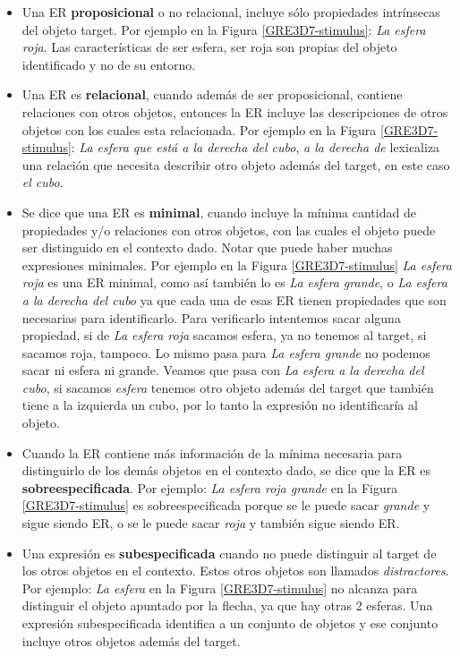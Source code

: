 \begin{itemize}
\item Una ER {\bf proposicional} o no relacional, incluye s\'olo propiedades intr\'insecas del objeto target. Por ejemplo en la Figura \ref{GRE3D7-stimulus}: {\it La esfera roja}. Las caracter\'isticas de ser esfera, ser roja son propias del objeto identificado y no de su entorno.

\item Una ER es {\bf relacional}, cuando adem\'as de ser proposicional, contiene relaciones con otros objetos, entonces la ER incluye las descripciones de otros objetos con los cuales esta relacionada. Por ejemplo en la Figura \ref{GRE3D7-stimulus}: {\it La esfera que est\'a a la derecha del cubo}, {\it a la derecha de} lexicaliza una relaci\'on que necesita describir otro objeto adem\'as del target, en este caso {\it el cubo}.

\item \label{sec:minimales} Se dice que una ER es {\bf minimal}, cuando incluye la m\'inima cantidad de propiedades y/o relaciones con otros objetos, con las cuales el objeto puede ser distinguido en el contexto dado. Notar que puede haber muchas expresiones minimales. Por ejemplo en la Figura \ref{GRE3D7-stimulus} {\it La esfera roja} es una ER minimal, como as\'i tambi\'en lo es {\it La esfera grande}, o {\it La esfera a la derecha del cubo} ya que cada una de esas ER tienen propiedades que son necesarias para identificarlo. Para verificarlo intentemos sacar alguna propiedad, si de {\it La esfera roja} sacamos esfera, ya no tenemos al target, si sacamos roja, tampoco. Lo mismo pasa para {\it La esfera grande} no podemos sacar ni esfera ni grande. Veamos que pasa con {\it La esfera a la derecha del cubo}, si sacamos {\it esfera} tenemos otro objeto adem\'as del target que tambi\'en tiene a la izquierda un cubo, por lo tanto la expresi\'on no identificar\'ia al objeto.

\item Cuando la ER contiene m\'as informaci\'on de la m\'inima necesaria para distinguirlo de los dem\'as objetos en el contexto dado, se dice que la ER es {\bf sobreespecificada}. Por ejemplo: {\it La esfera roja grande} en la Figura \ref{GRE3D7-stimulus} es sobreespecificada porque se le puede sacar {\it grande} y sigue siendo ER, o se le puede sacar {\it roja} y tambi\'en sigue siendo ER.

\item Una expresi\'on es {\bf subespecificada} cuando no puede distinguir al target de los otros objetos en el contexto. Estos otros objetos son llamados {\it distractores}. Por ejemplo: {\it La esfera} en la Figura \ref{GRE3D7-stimulus} no alcanza para distinguir el objeto apuntado por la flecha, ya que hay otras 2 esferas. Una expresi\'on subespecificada identifica a un conjunto de objetos y ese conjunto incluye otros objetos adem\'as del target.


\end{itemize}
